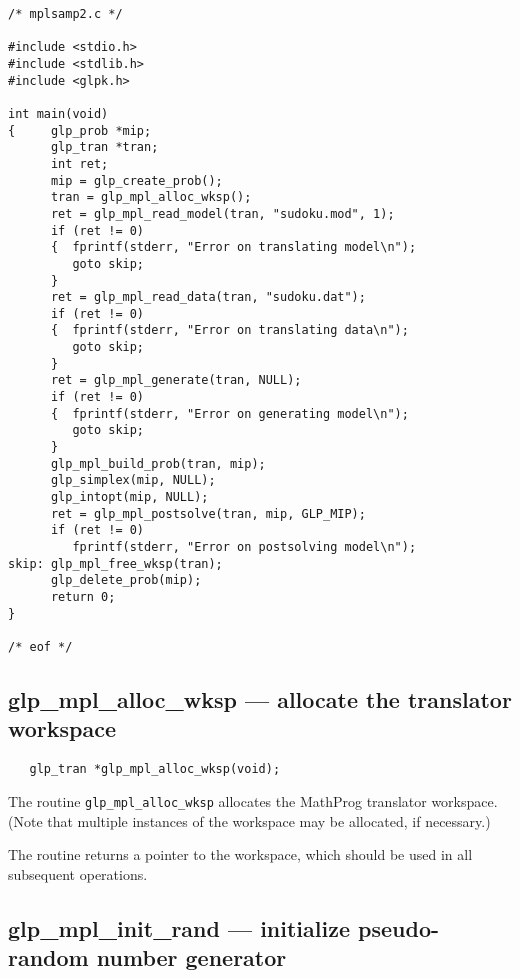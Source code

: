 \begin{small}
\begin{verbatim}
/* mplsamp2.c */

#include <stdio.h>
#include <stdlib.h>
#include <glpk.h>

int main(void)
{     glp_prob *mip;
      glp_tran *tran;
      int ret;
      mip = glp_create_prob();
      tran = glp_mpl_alloc_wksp();
      ret = glp_mpl_read_model(tran, "sudoku.mod", 1);
      if (ret != 0)
      {  fprintf(stderr, "Error on translating model\n");
         goto skip;
      }
      ret = glp_mpl_read_data(tran, "sudoku.dat");
      if (ret != 0)
      {  fprintf(stderr, "Error on translating data\n");
         goto skip;
      }
      ret = glp_mpl_generate(tran, NULL);
      if (ret != 0)
      {  fprintf(stderr, "Error on generating model\n");
         goto skip;
      }
      glp_mpl_build_prob(tran, mip);
      glp_simplex(mip, NULL);
      glp_intopt(mip, NULL);
      ret = glp_mpl_postsolve(tran, mip, GLP_MIP);
      if (ret != 0)
         fprintf(stderr, "Error on postsolving model\n");
skip: glp_mpl_free_wksp(tran);
      glp_delete_prob(mip);
      return 0;
}

/* eof */
\end{verbatim}
\end{small}

\newpage

\subsection{glp\_mpl\_alloc\_wksp --- allocate the translator
workspace}

\synopsis

\begin{verbatim}
   glp_tran *glp_mpl_alloc_wksp(void);
\end{verbatim}

\description

The routine \verb|glp_mpl_alloc_wksp| allocates the MathProg translator
work\-space. (Note that multiple instances of the workspace may be
allocated, if necessary.)

\returns

The routine returns a pointer to the workspace, which should be used in
all subsequent operations.

\subsection{glp\_mpl\_init\_rand --- initialize pseudo-random number
generator}

